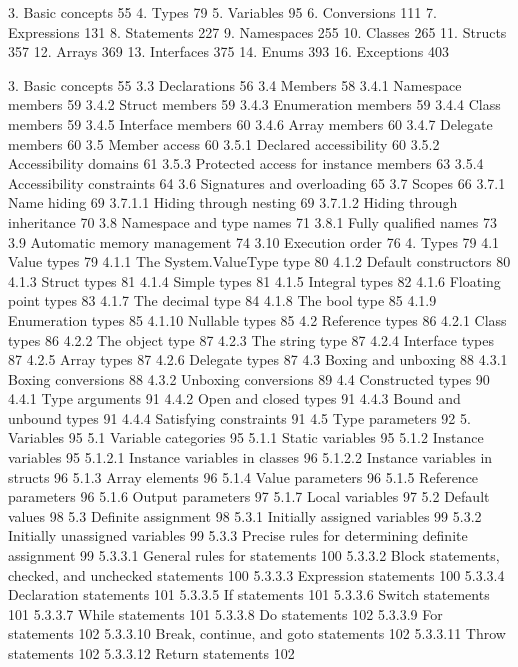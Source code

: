 3. Basic concepts	55
4. Types	79
5. Variables	95
6. Conversions	111
7. Expressions	131
8. Statements	227
9. Namespaces	255
10. Classes	265
11. Structs	357
12. Arrays	369
13. Interfaces	375
14. Enums	393
16. Exceptions	403



3. Basic concepts	55
3.3 Declarations	56
3.4 Members	58
3.4.1 Namespace members	59
3.4.2 Struct members	59
3.4.3 Enumeration members	59
3.4.4 Class members	59
3.4.5 Interface members	60
3.4.6 Array members	60
3.4.7 Delegate members	60
3.5 Member access	60
3.5.1 Declared accessibility	60
3.5.2 Accessibility domains	61
3.5.3 Protected access for instance members	63
3.5.4 Accessibility constraints	64
3.6 Signatures and overloading	65
3.7 Scopes	66
3.7.1 Name hiding	69
3.7.1.1 Hiding through nesting	69
3.7.1.2 Hiding through inheritance	70
3.8 Namespace and type names	71
3.8.1 Fully qualified names	73
3.9 Automatic memory management	74
3.10 Execution order	76
4. Types	79
4.1 Value types	79
4.1.1 The System.ValueType type	80
4.1.2 Default constructors	80
4.1.3 Struct types	81
4.1.4 Simple types	81
4.1.5 Integral types	82
4.1.6 Floating point types	83
4.1.7 The decimal type	84
4.1.8 The bool type	85
4.1.9 Enumeration types	85
4.1.10 Nullable types	85
4.2 Reference types	86
4.2.1 Class types	86
4.2.2 The object type	87
4.2.3 The string type	87
4.2.4 Interface types	87
4.2.5 Array types	87
4.2.6 Delegate types	87
4.3 Boxing and unboxing	88
4.3.1 Boxing conversions	88
4.3.2 Unboxing conversions	89
4.4 Constructed types	90
4.4.1 Type arguments	91
4.4.2 Open and closed types	91
4.4.3 Bound and unbound types	91
4.4.4 Satisfying constraints	91
4.5 Type parameters	92
5. Variables	95
5.1 Variable categories	95
5.1.1 Static variables	95
5.1.2 Instance variables	95
5.1.2.1 Instance variables in classes	96
5.1.2.2 Instance variables in structs	96
5.1.3 Array elements	96
5.1.4 Value parameters	96
5.1.5 Reference parameters	96
5.1.6 Output parameters	97
5.1.7 Local variables	97
5.2 Default values	98
5.3 Definite assignment	98
5.3.1 Initially assigned variables	99
5.3.2 Initially unassigned variables	99
5.3.3 Precise rules for determining definite assignment	99
5.3.3.1 General rules for statements	100
5.3.3.2 Block statements, checked, and unchecked statements	100
5.3.3.3 Expression statements	100
5.3.3.4 Declaration statements	101
5.3.3.5 If statements	101
5.3.3.6 Switch statements	101
5.3.3.7 While statements	101
5.3.3.8 Do statements	102
5.3.3.9 For statements	102
5.3.3.10 Break, continue, and goto statements	102
5.3.3.11 Throw statements	102
5.3.3.12 Return statements	102

